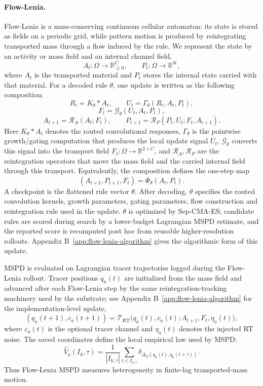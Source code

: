 \paragraph{Flow-Lenia.}
Flow-Lenia is a mass-conserving continuous cellular automaton: its state is stored as fields on a periodic grid, while pattern motion is produced by reintegrating transported mass through a flow induced by the rule.  We represent the state by an activity or mass field and an internal channel field,
\[
  A_t:\Omega\to\mathbb R_{\ge 0}^{C},
  \qquad
  P_t:\Omega\to\mathbb R^{K},
\]
where $A_t$ is the transported material and $P_t$ stores the internal state carried with that material.  For a decoded rule $\theta$, one update is written as the following composition:
\[
  R_t = K_\theta * A_t,
  \qquad
  U_t=\Gamma_\theta(R_t,A_t,P_t),
\]
\[
  F_t=\mathcal G_\theta(U_t,A_t,P_t),
\]
\[
  A_{t+1}=\mathcal R_A(A_t;F_t),
  \qquad
  P_{t+1}=\mathcal R_P(P_t,U_t;F_t,A_{t+1}).
\]
Here $K_\theta*A_t$ denotes the routed convolutional responses, $\Gamma_\theta$ is the pointwise growth/gating computation that produces the local update signal $U_t$, $\mathcal G_\theta$ converts this signal into the transport field $F_t:\Omega\to\mathbb R^{2\times C}$, and $\mathcal R_A,\mathcal R_P$ are the reintegration operators that move the mass field and the carried internal field through this transport.  Equivalently, the composition defines the one-step map
\[
  (A_{t+1},P_{t+1},F_t)=\Phi_\theta(A_t,P_t).
\]
A checkpoint is the flattened rule vector $\theta$.  After decoding, $\theta$ specifies the routed convolution kernels, growth parameters, gating parameters, flow construction and reintegration rule used in the update. $\theta$ is optimized by Sep-CMA-ES; candidate rules are scored during search by a lower-budget Lagrangian MSPD estimate, and the reported score is recomputed post hoc from reusable higher-resolution rollouts.  Appendix B~\ref{app:flow-lenia-algorithm} gives the algorithmic form of this update.

MSPD is evaluated on Lagrangian tracer trajectories logged during the Flow-Lenia rollout.  Tracer positions $q_a(t)$ are initialized from the mass field and advanced after each Flow-Lenia step by the same reintegration-tracking machinery used by the substrate; see Appendix B~\ref{app:flow-lenia-algorithm} for the implementation-level update,
\[
  (q_a(t+1),c_a(t+1))
  =
  \mathcal T_{\mathrm{RT}}
  \bigl(q_a(t),c_a(t);A_{t+1},F_t,\eta_a(t)\bigr),
\]
where $c_a(t)$ is the optional tracer channel and $\eta_a(t)$ denotes the injected RT noise.  The saved coordinates define the local empirical law used by MSPD:
\[
  \widehat V_a(I_k,\tau)
  =
  \frac{1}{|I_{k,\tau}|}
  \sum_{t\in I_{k,\tau}}
  \delta_{\Delta_\Omega(q_a(t),q_a(t+\tau))}.
\]
Thus Flow-Lenia MSPD measures heterogeneity in finite-lag transported-mass motion.

